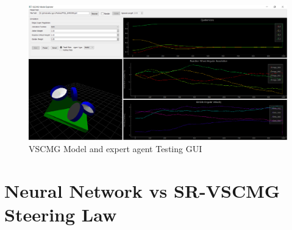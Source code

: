 \begin{figure}[H]
    \centering
    \includegraphics[width=\textwidth]{figures/AI/ModelExplorer1.pdf}
    \caption{VSCMG Model and expert agent Testing GUI}
    \label{fig:model_explorer}
\end{figure}


\section{Neural Network vs SR-VSCMG Steering Law}

